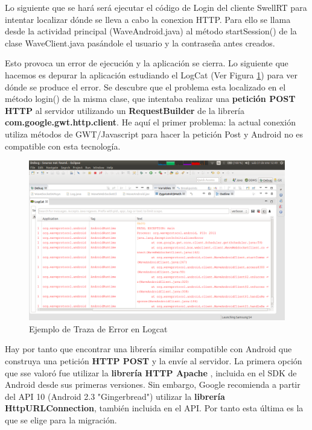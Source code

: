 	 Lo siguiente que se hará será ejecutar el código de Login del cliente SwellRT para intentar localizar dónde se lleva a cabo la conexion HTTP. Para ello se llama desde la actividad principal (WaveAndroid.java) al método startSession() de la clase WaveClient.java pasándole el usuario y la contraseña antes creados.
 
	 Esto provoca un error de ejecución y la aplicación se cierra. Lo siguiente que hacemos es depurar la aplicación estudiando el LogCat \cite{ref:android_logcat} (Ver Figura \ref{fig:android_logcat}) para ver dónde se produce el error. Se descubre que el problema esta localizado en el método login() de la misma clase, que intentaba realizar una \textbf{petición POST HTTP} al servidor utilizando un \textbf{RequestBuilder} de la librería \textbf{com.google.gwt.http.client}. He aquí el primer problema: la actual conexión utiliza métodos de GWT/Javascript para hacer la petición Post y Android no es compatible con esta tecnología.   
	 
	\begin{figure}[H]
      \centering
	\includegraphics[keepaspectratio, scale=0.3]{Media/Captures/logcat_example.png}
      \caption{Ejemplo de Traza de Error en Logcat}
      \label{fig:android_logcat}
    \end{figure} 
	 
	 Hay por tanto que encontrar una librería similar compatible con Android que construya una petición \textbf{HTTP POST} y la envíe al servidor. La primera opción que sse valoró fue utilizar la \textbf{librería HTTP Apache} \cite{ref:apache_http}, incluida en el SDK de Android desde sus primeras versiones. Sin embargo, Google recomienda \cite{ref:http_recommmendations} a partir del API 10 (Android 2.3 "Gingerbread") utilizar la \textbf{librería HttpURLConnection}\cite{ref:android_httpUrlConnection}, también incluida en el API. Por tanto esta última es la que se elige para la migración. 
	 
